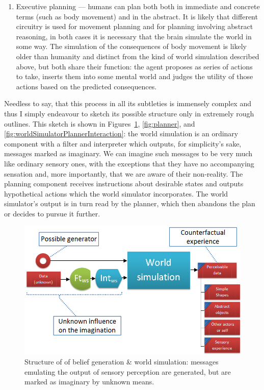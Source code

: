 \begin{enumerate}
	
	\item Executive planning --- humans can plan both both in immediate and concrete terms (such as body movement) and in the abstract. It is likely that different circuitry is used for movement planning and for planning involving abstract reasoning, in both cases it is necessary that the brain simulate the world in some way. The simulation of the consequences of body movement is likely older than humanity and distinct from the kind of world simulation described above, but both share their function: the agent proposes as series of actions to take, inserts them into some mental world and judges the utility of those actions based on the predicted consequences.
\end{enumerate}

Needless to say, that this process in all its subtleties is immensely complex and thus I simply endeavour to sketch its possible structure only in extremely rough outlines. This sketch is shown in Figures~\ref{fig:imagination},  \ref{fig:planner}, and \ref{fig:worldSimulatorPlannerInteraction}: the world simulation is an ordinary component with a filter and interpreter which outputs, for simplicity's sake, messages marked as imaginary. We can imagine such messages to be very much like ordinary sensory ones, with the exceptions that they have no accompanying sensation and, more importantly, that we are aware of their non-reality. The planning component receives instructions about desirable states and outputs hypothetical actions which the world simulator incorporates. The world simulator's output is in turn read by the planner, which then abandons the plan or decides to pursue it further.

\begin{figure}
	\centering
	\includegraphics[width=\textwidth]{Figs/imagination.png}
	\caption{Structure of of belief generation \& world simulation: messages emulating the output of sensory perception are generated, but are marked as imaginary by unknown means.}
	\label{fig:imagination}
\end{figure}

